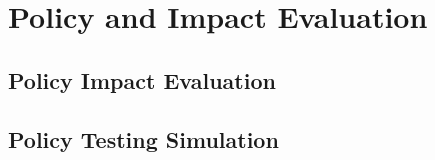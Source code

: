 \documentclass[man]{apa7}
\begin{document}
\newpage
\section{Policy and Impact Evaluation}


\subsection{Policy Impact Evaluation}


\subsection{Policy Testing Simulation}


\printbibliography

% 
% 
\end{document}
